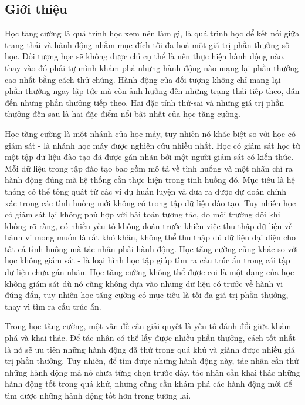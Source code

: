 \documentclass{uetgraduation}
\begin{document}
\subsection{Giới thiệu}
Học tăng cường là quá trình học xem nên làm gì, là quá trình học để kết nối giữa trạng thái và hành động nhằm mục đích tối đa hoá một giá trị phần thưởng số học. Đối tượng học sẽ không được chỉ cụ thể là
nên thực hiện hành động nào, thay vào đó phải tự mình khám phá những hành động nào mạng lại phần thưởng cao nhất bằng cách thử chúng. Hành động của đối tượng không chỉ mang lại phần thưởng ngay lập tức mà còn ảnh hưởng
đến những trạng thái tiếp theo, dẫn đến những phần thưởng tiếp theo. Hai đặc tính thử-sai và những giá trị phần thưởng đến sau là hai đặc điểm nổi bật nhất của học tăng cường.

Học tăng cường là một nhánh của học máy, tuy nhiên nó khác biệt so với học có giám sát - là nhánh học máy được nghiên cứu nhiều nhất. Học có giám sát học từ một tập dữ liệu đào tạo đã được gán nhãn
bởi một người giám sát có kiến thức. Mỗi dữ liệu trong tập đào tạo bao gồm mô tả về tình huống và một nhãn chỉ ra hành động đúng mà hệ thống cần thực hiện trong tình huống đó. Mục tiêu là hệ thống
có thể tổng quát từ các ví dụ huấn luyện và đưa ra được dự đoán chính xác trong các tình huống mới không có trong tập dữ liệu đào tạo. Tuy nhiên học có giám sát lại không phù hợp với bài toán tương
tác, do môi trường đôi khi không rõ ràng, có nhiều yếu tố không đoán trước khiến việc thu thập dữ liệu về hành vi mong muốn là rất khó khăn, không thể thu thập đủ dữ liệu đại diện cho tất cả tình huống
mà tác nhân phải hành động. Học tăng cường cũng khác so với học không giám sát - là loại hình học tập giúp tìm ra cấu trúc ẩn trong cái tập dữ liệu chưa gán nhãn. Học tăng cường không thể được coi là
một dạng của học không giám sát dù nó cũng không dựa vào những dữ liệu có trước về hành vi đúng đắn, tuy nhiên học tăng cường có mục tiêu là tối đa giá trị phần thưởng, thay vì tìm ra cấu trúc ẩn.

Trong học tăng cường, một vấn đề cần giải quyết là yếu tố đánh đổi giữa khám phá và khai thác. Để tác nhân có thể lấy được nhiều phần thưởng, cách tốt nhất là nó sẽ ưu tiên những hành động đã thử trong
quá khứ và giành được nhiều giá trị phần thưởng. Tuy nhiên, để tìm được những hành động này, tác nhân cần thử những hành động mà nó chưa từng chọn trước đây. tác nhân cần khai thác những hành động tốt trong
quá khứ, nhưng cũng cần khám phá các hành động mới để tìm được những hành động tốt hơn trong tương lai.
\end{document}
